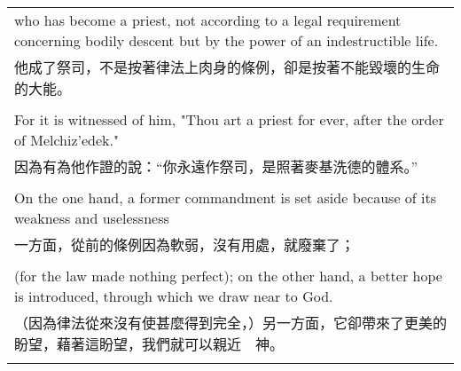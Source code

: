 \begin{tabularx}{\textwidth}{p{}}
who has become a priest, not according to a legal requirement concerning bodily descent but by the power of an indestructible life. \\
他成了祭司，不是按著律法上肉身的條例，卻是按著不能毀壞的生命的大能。 \\ \\
For it is witnessed of him, "Thou art a priest for ever, after the order of Melchiz'edek." \\
因為有為他作證的說：“你永遠作祭司，是照著麥基洗德的體系。” \\ \\
On the one hand, a former commandment is set aside because of its weakness and uselessness \\
一方面，從前的條例因為軟弱，沒有用處，就廢棄了； \\ \\
(for the law made nothing perfect); on the other hand, a better hope is introduced, through which we draw near to God. \\
（因為律法從來沒有使甚麼得到完全，）另一方面，它卻帶來了更美的盼望，藉著這盼望，我們就可以親近　神。 \\ \\

\hline
\end{tabularx}

